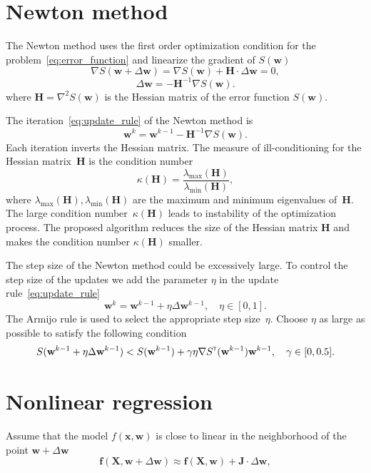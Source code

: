 \documentclass[
11pt,%
tightenlines,%
twoside,%
onecolumn,%
nofloats,%
nobibnotes,%
nofootinbib,%
superscriptaddress,%
noshowpacs,%
centertags]%
{revtex4}
\newcommand{\bw}{\mathbf{w}}
\newcommand{\bx}{\mathbf{x}}
\newcommand{\bJ}{\mathbf{J}}
\newcommand{\bH}{\mathbf{H}}
\newcommand{\bX}{\mathbf{X}}
\newcommand{\T}{{\text{\tiny\sffamily\upshape\mdseries T}}}
\begin{document}
\section{Newton method}	
The Newton method uses the first order optimization condition for the problem~\eqref{eq:error_function} and linearize the gradient of $S(\bw)$
\[
\nabla S (\bw + \Delta \bw) = \nabla S(\bw) + \bH \cdot \Delta \bw = 0,
\]
\[
\Delta \bw = - \bH^{-1} \nabla S(\bw).
\]
where $\bH = \nabla^2 S(\bw)$ is the Hessian matrix of the error function $S(\bw)$.

The iteration~\eqref{eq:update_rule} of the Newton method is
\[
\bw^k = \bw^{k-1} - \bH^{-1} \nabla S(\bw).
\]
Each iteration inverts the Hessian matrix.
The measure of ill-conditioning for the Hessian matrix~$\bH$ is the condition number
\[
\kappa(\bH) = \frac{\lambda_{\text{max}}(\bH)}{\lambda_{\text{min}}(\bH)},
\]
where $\lambda_{\text{max}}(\bH), \lambda_{\text{min}}(\bH)$ are the maximum and minimum eigenvalues of~$\bH$. The large condition number~$\kappa(\bH)$ leads to instability of the optimization process.
The proposed algorithm reduces the size of the Hessian matrix $\bH$ and makes the condition number $\kappa(\bH)$ smaller.

The step size of the Newton method could be excessively large. To control the step size of the updates we add the parameter $\eta$ in the update rule~\eqref{eq:update_rule}
\[
\bw^k = \bw^{k - 1} + \eta \Delta \bw^{k - 1}, \quad \eta \in [0, 1].
\]
The Armijo rule is used to select the appropriate step size~$\eta$. Choose $\eta$ as large as possible to satisfy the following condition
\[
S(\bw^{k - 1} + \eta \Delta \bw^{k - 1}) < S(\bw^{k - 1}) + \gamma \eta \nabla S^{\T}(\bw^{k-1})\bw^{k - 1}, \quad \gamma \in [0, 0.5].
\]

\section{Nonlinear regression}
	Assume that the model $f(\bx , \bw)$ is close to linear in the neighborhood of the point $\bw + \Delta \bw$
\[
\mathbf{f}(\bX , \bw + \Delta \bw) \approx \mathbf{f}(\bX , \bw) + \bJ \cdot \Delta  \bw,
\]
\end{document}
